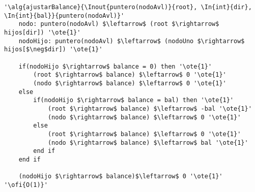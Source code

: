 \begin{lstlisting}[mathescape]
'\alg{ajustarBalance}{\Inout{puntero(nodoAvl)}{root}, \In{int}{dir}, \In{int}{bal}}{puntero(nodoAvl)}'
	nodo: puntero(nodoAvl) $\leftarrow$ (root $\rightarrow$ hijos[dir]) '\ote{1}'
	nodoHijo: puntero(nodoAvl) $\leftarrow$ (nodoUno $\rightarrow$ hijos[$\neg$dir]) '\ote{1}'

	if(nodoHijo $\rightarrow$ balance = 0) then '\ote{1}'
		(root $\rightarrow$ balance) $\leftarrow$ 0 '\ote{1}'
		(nodo $\rightarrow$ balance) $\leftarrow$ 0 '\ote{1}'
	else
		if(nodoHijo $\rightarrow$ balance = bal) then '\ote{1}'
			(root $\rightarrow$ balance) $\leftarrow$ -bal '\ote{1}'
			(nodo $\rightarrow$ balance) $\leftarrow$ 0 '\ote{1}'
		else
			(root $\rightarrow$ balance) $\leftarrow$ 0 '\ote{1}'
			(nodo $\rightarrow$ balance) $\leftarrow$ bal '\ote{1}'
		end if
	end if

	(nodoHijo $\rightarrow$ balance)$\leftarrow$ 0 '\ote{1}'
'\ofi{O(1)}'
\end{lstlisting}

